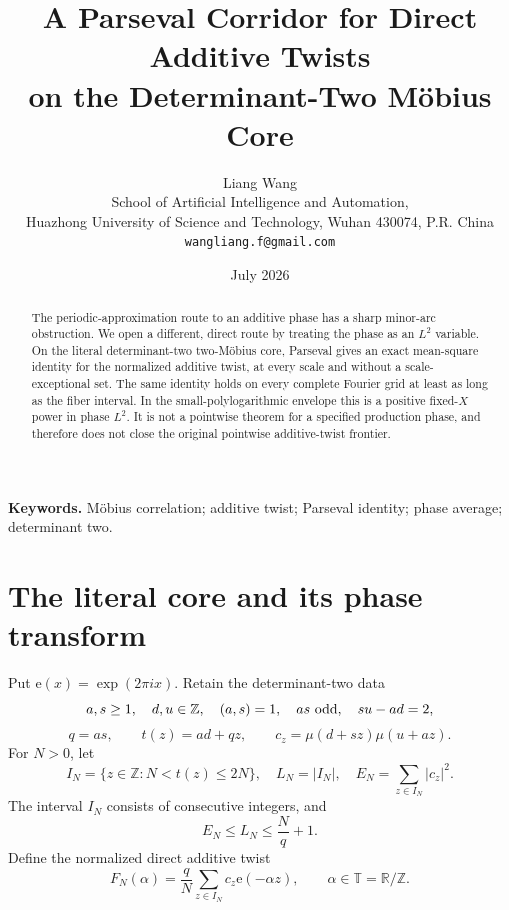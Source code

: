 \documentclass[11pt]{article}
\title{\textbf{A Parseval Corridor for Direct Additive Twists\\
on the Determinant-Two M\"obius Core}}
\author{Liang Wang\\
\small School of Artificial Intelligence and Automation,\\[-2pt]
\small Huazhong University of Science and Technology, Wuhan 430074, P.R. China\\
\small \texttt{wangliang.f@gmail.com}}
\date{July 2026}
\theoremstyle{definition}
\newcommand{\e}{\mathrm e}
\newcommand{\T}{\mathbb T}
\begin{document}
\maketitle

\begin{abstract}
The periodic-approximation route to an additive phase has a sharp
minor-arc obstruction.  We open a different, direct route by treating
the phase as an \(L^2\) variable.  On the literal determinant-two
two-M\"obius core, Parseval gives an exact mean-square identity for
the normalized additive twist, at every scale and without a
scale-exceptional set.  The same identity holds on every complete
Fourier grid at least as long as the fiber interval.  In the
small-polylogarithmic envelope this is a positive fixed-\(X\) power
in phase \(L^2\).  It is not a pointwise theorem for a specified
production phase, and therefore does not close the original
pointwise additive-twist frontier.
\end{abstract}

\noindent\textbf{Keywords.}
M\"obius correlation; additive twist; Parseval identity; phase
average; determinant two.

\medskip
\noindent{}

\section{The literal core and its phase transform}

Put \(\e(x)=\exp(2\pi i x)\).  Retain the determinant-two data
\[
 a,s\ge1,\quad d,u\in\mathbb Z,\quad
 (a,s)=1,\quad as\ {\rm odd},\quad su-ad=2,
\]
\[
 q=as,\qquad t(z)=ad+qz,\qquad
 c_z=\mu(d+sz)\mu(u+az).
\]
For \(N>0\), let
\[
 I_N=\{z\in\mathbb Z:N<t(z)\le2N\},\quad
 L_N=|I_N|,\quad E_N=\sum_{z\in I_N}|c_z|^2.
\]
The interval \(I_N\) consists of consecutive integers, and
\begin{equation}
 E_N\le L_N\le\frac Nq+1.
\label{eq:count}
\end{equation}
Define the normalized direct additive twist
\begin{equation}
 F_N(\alpha)=\frac qN\sum_{z\in I_N}c_z\e(-\alpha z),
 \qquad \alpha\in\T=\mathbb R/\mathbb Z.
\label{eq:transform}
\end{equation}
\end{document}

